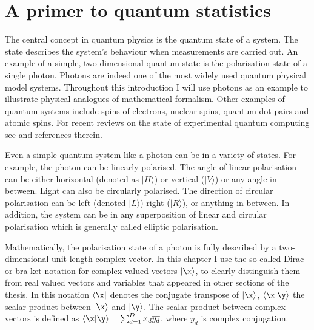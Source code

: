 
\section{A primer to quantum statistics}

The central concept in quantum physics is the quantum state of a system. The state describes the system's behaviour when measurements are carried out. An example of a simple, two-dimensional quantum state is the polarisation state of a single photon. Photons are indeed one of the most widely used quantum physical model systems. Throughout this introduction I will use photons as an example to illustrate physical analogues of mathematical formalism. Other examples of quantum systems include spins of electrons, nuclear spins, quantum dot pairs and atomic spins. For recent reviews on the state of experimental quantum computing see \citep{Ladd2010} and references therein.

Even a simple quantum system like a photon can be in a variety of states. For example, the photon can be linearly polarised. The angle of linear polarisation can be either horizontal (denoted as $\vert H\rangle$) or vertical ($\vert V \rangle$) or any angle in between. Light can also be circularly polarised. The direction of circular polarisation can be left (denoted $\vert L\rangle$) right ($\vert R\rangle$), or anything in between. In addition, the system can be in any superposition of linear and circular polarisation which is generally called elliptic polarisation.

Mathematically, the polarisation state of a photon is fully described by a two-dimensional unit-length complex vector. In this chapter I use the so called Dirac or bra-ket notation \citep{Dirac1939} for complex valued vectors $\vert\x\rangle$, to clearly distinguish them from real valued vectors and variables that appeared in other sections of the thesis. In this notation $\langle\x\vert$ denotes the conjugate transpose of $\vert\x\rangle$, $\langle\x\vert\y\rangle$ the scalar product between $\vert\x\rangle$ and $\vert\y\rangle$. The scalar product between complex vectors is defined as $\langle\x\vert\y\rangle = \sum_{d=1}^{D} x_d \overline{y_d}$, where $\overline{y_d}$ is complex conjugation.

